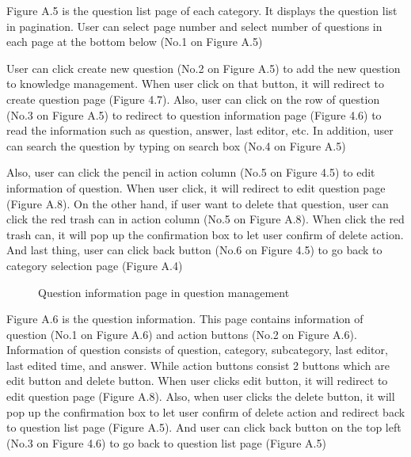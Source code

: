 \documentclass[12pt,oneside,openright,a4paper]{cpe-english-project}
\begin{document}
Figure A.5 is the question list page of each category. It displays the question list in 
pagination. User can select page number and select number of questions in each page at the 
bottom below (No.1 on Figure A.5)

User can click create new question (No.2 on Figure A.5) to add the new question to 
knowledge management. When user click on that button, it will redirect to create question 
page (Figure 4.7). Also, user can click on the row of question (No.3 on Figure A.5) to redirect 
to question information page (Figure 4.6) to read the information such as question, answer, 
last editor, etc. In addition, user can search the question by typing on search box (No.4 on 
Figure A.5)

Also, user can click the pencil in action column (No.5 on Figure 4.5) to edit 
information of question. When user click, it will redirect to edit question page (Figure A.8). 
On the other hand, if user want to delete that question, user can click the red trash can in 
action column (No.5 on Figure A.8). When click the red trash can, it will pop up the 
confirmation box to let user confirm of delete action.
And last thing, user can click back button (No.6 on Figure 4.5) to go back to category 
selection page (Figure A.4)

\begin{figure}[!h]\centering
{}
\caption{Question information page in question management}
\label{fig:Question information page in question management}
\end{figure}

Figure A.6 is the question information. This page contains information of question 
(No.1 on Figure A.6) and action buttons (No.2 on Figure A.6).
Information of question consists of question, category, subcategory, last editor, last 
edited time, and answer. While action buttons consist 2 buttons which are edit button and 
delete button. When user clicks edit button, it will redirect to edit question page (Figure A.8). 
Also, when user clicks the delete button, it will pop up the confirmation box to let user 
confirm of delete action and redirect back to question list page (Figure A.5). And user can 
click back button on the top left (No.3 on Figure 4.6) to go back to question list page (Figure 
A.5)
\end{document}
